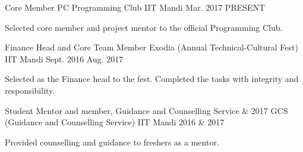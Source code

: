 \begin{cventries}
  \cventry
    {Core Member}
    {PC \- Programming Club}
    {IIT Mandi}
    {Mar. 2017 \- PRESENT}
    {
      \begin{cvitems}
        \item {Selected core member and project mentor to the official Programming Club.}
      \end{cvitems}
    }
  \cventry
    {Finance Head and Core Team Member}
    {Exodia (Annual Technical-Cultural Fest)}
    {IIT Mandi}
    {Sept. 2016 \- Aug. 2017}
    {
      \begin{cvitems}
        \item {Selected as the Finance head to the fest. Completed the tasks with integrity and responsibility.}
      \end{cvitems}
    }
 \cventry
   {Student Mentor and member, Guidance and Counselling Service  \& 2017}
   {GCS (Guidance and Counselling Service)}
   {IIT Mandi}
   {2016 \& 2017 }
   {
     \begin{cvitems}
       \item {Provided counselling and guidance to freshers as a mentor.}
     \end{cvitems}
   }
\end{cventries}

